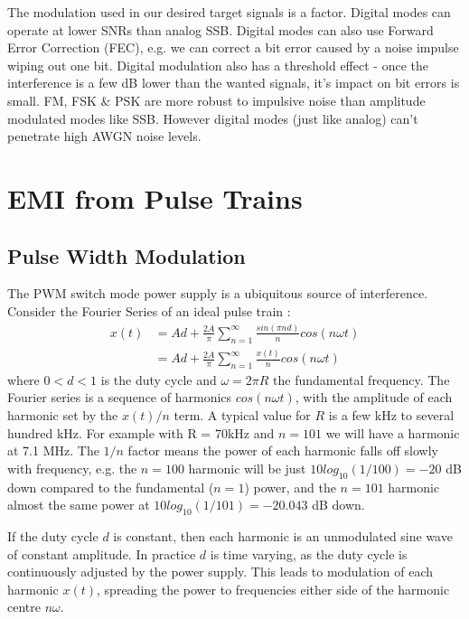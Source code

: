 \documentclass{article}
\begin{document}
The modulation used in our desired target signals is a factor.  Digital modes can operate at lower SNRs than analog SSB.  Digital modes can also use Forward Error Correction (FEC), e.g. we can correct a bit error caused by a noise impulse wiping out one bit.  Digital modulation also has a threshold effect - once the interference is a few dB lower than the wanted signals, it's impact on bit errors is small. FM, FSK \& PSK are more robust to impulsive noise than amplitude modulated modes like SSB.  However digital modes (just like analog) can't penetrate high AWGN noise levels.

\section{EMI from Pulse Trains}
\label{pwm}

\subsection{Pulse Width Modulation}
\label{smps}

The PWM switch mode power supply is a ubiquitous source of interference.  Consider the Fourier Series of an ideal pulse train \cite{wikipedia_pulse}:
\begin{equation} \label{eq_pwm}
\begin{split}
x(t) &= Ad+\frac{2A}{\pi} \sum_{n=1}^{\infty} \frac{sin(\pi n d)}{n}cos(n \omega t) \\
     &= Ad+\frac{2A}{\pi} \sum_{n=1}^{\infty} \frac{x(t)}{n} cos(n \omega t)
\end{split}
\end{equation}
where $0<d<1$ is the duty cycle and $\omega=2 \pi R$ the fundamental frequency.  The Fourier series is a sequence of harmonics $cos(n \omega t)$, with the amplitude of each harmonic set by the $x(t)/n$ term. A typical value for $R$ is a few kHz to several hundred kHz. For example with R = 70kHz and $n=101$ we will have a harmonic at 7.1 MHz. The $1/n$ factor means the power of each harmonic falls off slowly with frequency, e.g. the $n=100$ harmonic will be just $10log_{10}(1/100)=-20$ dB down compared to the fundamental ($n=1$) power, and the $n=101$ harmonic almost the same power at $10log_{10}(1/101)=-20.043$ dB down.

If the duty cycle $d$ is constant, then each harmonic is an unmodulated sine wave of constant amplitude. In practice $d$ is time varying, as the duty cycle is continuously adjusted by the power supply.  This leads to modulation of each harmonic $x(t)$, spreading the power to frequencies either side of the harmonic centre $n \omega$.
\end{document}

